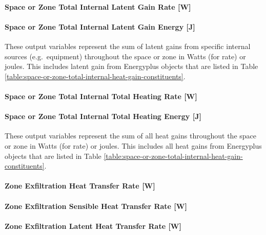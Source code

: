 \paragraph{Space or Zone Total Internal Latent Gain Rate {[}W{]}}\label{zone-total-internal-latent-gain-rate-w}

\paragraph{Space or Zone Total Internal Latent Gain Energy {[}J{]}}\label{zone-total-internal-latent-gain-energy-j}

These output variables represent the sum of latent gains from specific internal sources (e.g.~equipment) throughout the space or zone in Watts (for rate) or joules. This includes latent gain from Energyplus objects that are listed in Table \ref{table:space-or-zone-total-internal-heat-gain-constituents}.

\paragraph{Space or Zone Total Internal Total Heating Rate {[}W{]}}\label{zone-total-internal-total-heating-rate-w}

\paragraph{Space or Zone Total Internal Total Heating Energy {[}J{]}}\label{zone-total-internal-total-heating-energy-j}

These output variables represent the sum of all heat gains throughout the space or zone in Watts (for rate) or joules. This includes all heat gains from Energyplus objects that are listed in Table \ref{table:space-or-zone-total-internal-heat-gain-constituents}.

\paragraph{Zone Exfiltration Heat Transfer Rate {[}W{]}}\label{zone-exfiltration-heat-transfer-rate-w}

\paragraph{Zone Exfiltration Sensible Heat Transfer Rate {[}W{]}}\label{zone-exfiltration-sensible-heat-transfer-rate-w}

\paragraph{Zone Exfiltration Latent Heat Transfer Rate {[}W{]}}\label{zone-exfiltration-latent-heat-transfer-rate-w}

